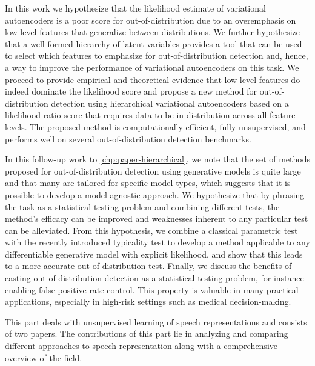 In this work we hypothesize that the likelihood estimate of variational autoencoders is a poor score for out-of-distribution due to an overemphasis on low-level features that generalize between distributions. 
We further hypothesize that a well-formed hierarchy of latent variables provides a tool that can be used to select which features to emphasize for out-of-distribution detection and, hence, a way to improve the performance of variational autoencoders on this task. 
We proceed to provide empirical and theoretical evidence that low-level features do indeed dominate the likelihood score and propose a new method for out-of-distribution detection using hierarchical variational autoencoders based on a likelihood-ratio score that requires data to be in-distribution across all feature-levels. 
The proposed method is computationally efficient, fully unsupervised, and performs well on several out-of-distribution detection benchmarks. 

In this follow-up work to \cref{chp:paper-hierarchical}, we note that the set of methods proposed for out-of-distribution detection using generative models is quite large and that many are tailored for specific model types, which suggests that it is possible to develop a model-agnostic approach. We hypothesize that by phrasing the task as a statistical testing problem and combining different tests, the method's efficacy can be improved and weaknesses inherent to any particular test can be alleviated. 
From this hypothesis, we combine a classical parametric test with the recently introduced typicality test to develop a method applicable to any differentiable  generative model with explicit likelihood, and show that this leads to a more accurate out-of-distribution test. 
Finally, we discuss the benefits of casting out-of-distribution detection as a statistical testing problem, for instance enabling false positive rate control. This property is valuable in many practical applications, especially in high-risk settings such as medical decision-making.


This part deals with unsupervised learning of speech representations and consists of two papers. 
The contributions of this part lie in analyzing and comparing different approaches to speech representation along with a comprehensive overview of the field.

